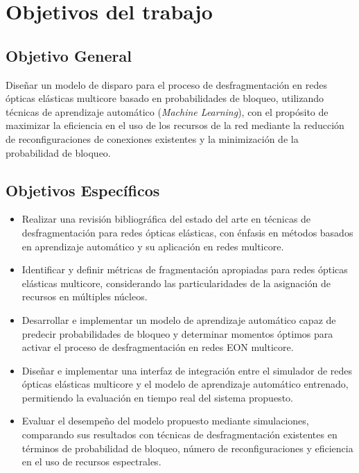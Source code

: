 \section{Objetivos del trabajo}
\subsection{Objetivo General}
Diseñar un modelo de disparo para el proceso de desfragmentación en redes ópticas elásticas multicore basado en probabilidades de bloqueo, utilizando técnicas de aprendizaje automático (\textit{Machine Learning}), con el propósito de maximizar la eficiencia en el uso de los recursos de la red mediante la reducción de reconfiguraciones de conexiones existentes y la minimización de la probabilidad de bloqueo. 

\subsection{Objetivos Específicos}
\begin{itemize}
    \item Realizar una revisión bibliográfica del estado del arte en técnicas de desfragmentación para redes ópticas elásticas, con énfasis en métodos basados en aprendizaje automático y su aplicación en redes multicore.

    \item Identificar y definir métricas de fragmentación apropiadas para redes ópticas elásticas multicore, considerando las particularidades de la asignación de recursos en múltiples núcleos.
    
    \item Desarrollar e implementar un modelo de aprendizaje automático capaz de predecir probabilidades de bloqueo y determinar momentos óptimos para activar el proceso de desfragmentación en redes EON multicore.
    
    \item Diseñar e implementar una interfaz de integración entre el simulador de redes ópticas elásticas multicore y el modelo de aprendizaje automático entrenado, permitiendo la evaluación en tiempo real del sistema propuesto.
    
    \item Evaluar el desempeño del modelo propuesto mediante simulaciones, comparando sus resultados con técnicas de desfragmentación existentes en términos de probabilidad de bloqueo, número de reconfiguraciones y eficiencia en el uso de recursos espectrales.
\end{itemize}

